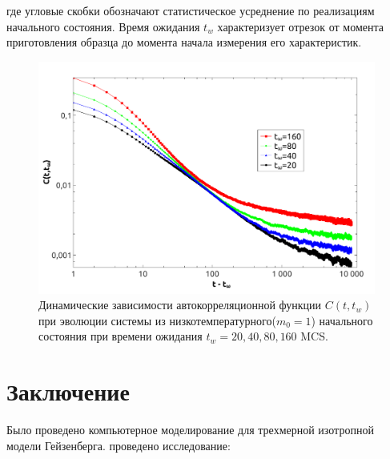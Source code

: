 \documentclass[a4paper,14pt]{extarticle}
\begin{document}
где угловые скобки обозначают статистическое усреднение по реализациям начального состояния. Время ожидания $t_w$ характеризует отрезок
от момента приготовления образца до момента начала
измерения его характеристик.

\begin{figure}[h!]
	\begin{center}
		\includegraphics[width=0.99\textwidth]{C.pdf}
		\caption{\label{testSolution} Динамические зависимости автокорреляционной функции $C(t,t_w)$ при эволюции системы из низкотемпературного($m_0=1$) начального состояния при времени ожидания $t_w=20,40,80,160$ MCS.}
	\end{center}
\end{figure}

\newpage
\section*{Заключение}


Было проведено компьютерное моделирование для трехмерной изотропной модели Гейзенберга. проведено исследование:
\end{document}
